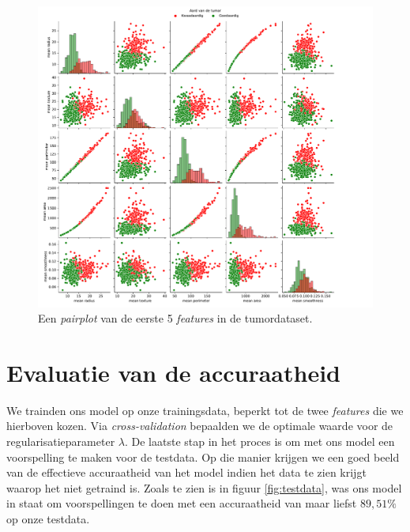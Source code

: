 \documentclass[twoside, kulak]{kulakreport}
\begin{document}
	\begin{figure}
		\centering
		\includegraphics[width=1\textwidth]{pairplot}
		\caption{Een \textit{pairplot} van de eerste 5 \textit{features} in de tumordataset.}
		\label{fig:pairplot}
	\end{figure}
	
	\section{Evaluatie van de accuraatheid}
	
	We trainden ons model op onze trainingsdata, beperkt tot de twee \textit{features} die we hierboven kozen. Via \textit{cross-validation} bepaalden we de optimale waarde voor de regularisatieparameter \(\lambda\). De laatste stap in het proces is om met ons model een voorspelling te maken voor de testdata. Op die manier krijgen we een goed beeld van de effectieve accuraatheid van het model indien het data te zien krijgt waarop het niet getraind is. Zoals te zien is in figuur \ref{fig:testdata}, was ons model in staat om voorspellingen te doen met een accuraatheid van maar liefst \(89,51\%\) op onze testdata.
	
\end{document}
